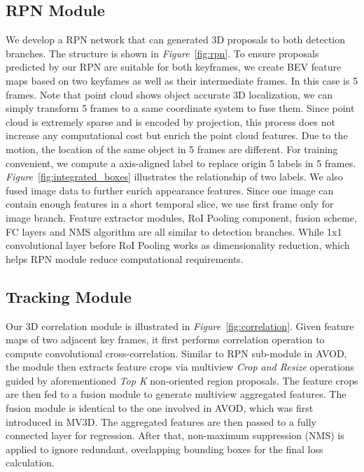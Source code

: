 \documentclass[letterpaper, 10 pt, conference]{ieeeconf}  %
\def\figurename{\emph{Figure}}
\begin{document}
\subsection{RPN Module}

We develop a RPN network that can generated 3D proposals to both detection branches. The structure is shown in \figurename \, \ref{fig:rpn}. To ensure proposals predicted by our RPN are suitable for both keyframes, we create BEV feature maps based on two keyfames as well as their intermediate frames. In this case is 5 frames. Note that point cloud shows object accurate 3D localization, we can simply transform 5 frames to a same coordinate system to fuse them. Since point cloud is extremely sparse and is encoded by projection, this process does not increase any computational cost but enrich the point cloud features. Due to the motion, the location of the same object in 5 frames are different. For training convenient, we compute a axis-aligned label to replace origin 5 labels in 5 frames. \figurename \, \ref{fig:integrated_boxes} illustrates the relationship of two labels. We also fused image data to further enrich appearance features. Since one image can contain enough features in a short temporal slice, we use first frame only for image branch. Feature extractor modules, RoI Pooling component, fusion scheme, FC layers and NMS algorithm are all similar to detection branches. While 1x1 convolutional layer before RoI Pooling works as dimensionality reduction, which helps RPN module reduce computational requirements.


\subsection{Tracking Module}
Our 3D correlation module is illustrated in \figurename \, \ref{fig:correlation}. Given feature maps of two adjacent key frames, it first performs correlation operation to compute convolutional cross-correlation. Similar to RPN sub-module in AVOD, the module then extracts feature crops via multiview \textit{Crop and Resize} operations guided by aforementioned \textit{Top K} non-oriented region proposals. The feature crops are then fed to a fusion module to generate multiview aggregated features. The fusion module is identical to the one involved in AVOD, which was first introduced in MV3D\cite{chen2017multi}. The aggregated features are then passed to a fully connected layer for regression. After that, non-maximum suppression (NMS) is applied to ignore redundant, overlapping bounding boxes for the final loss calculation.
\end{document}
